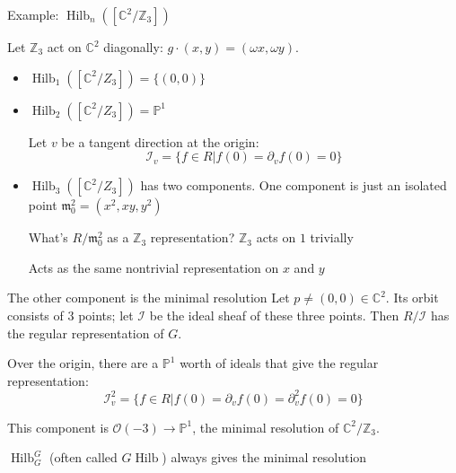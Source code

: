 \documentclass{beamer}
\DeclareMathOperator{\Hilb}{Hilb}
\newcommand{\C}{\mathbb{C}}
\newcommand{\Z}{\mathbb{Z}}
\newcommand{\proj}{\mathbb{P}}
\begin{document}
\begin{frame}{Example: $\Hilb_n([\C^2/\Z_3])$}

Let $\Z_3$ act on $\C^2$ diagonally: $g\cdot(x,y)=(\omega x, \omega y)$.
\begin{itemize}
\item $\Hilb_1([\C^2/Z_3])=\{(0,0)\}$ 
\item $\Hilb_2([\C^2/Z_3])=\proj^1$ 

Let $v$ be a tangent direction at the origin: 
$$\mathcal{I}_v=\{f\in R | f(0)=\partial_vf(0)=0\}$$
\item
$\Hilb_3([\C^2/Z_3])$ has two components.  One component is just an isolated point $\mathfrak{m}_0^2=(x^2, xy, y^2)$

\begin{block}{What's $R/\mathfrak{m}_0^2$ as a $\Z_3$ representation?} 
$\Z_3$ acts on $1$ trivially

Acts as the same nontrivial representation on $x$ and $y$
\end{block}


\end{itemize}



\end{frame}

\begin{frame}{The other  component is the minimal resolution}
Let $p\neq(0,0)\in\C^2$.  Its orbit consists of $3$ points; let $\mathcal{I}$ be the ideal sheaf of these three points.  Then $R/\mathcal{I}$ has the regular representation of $G$.  

Over the origin, there are a $\proj^1$ worth of ideals that give the regular representation: 
$$\mathcal{I}_v^2=\{f\in R| f(0)=\partial_vf(0)=\partial_v^2 f(0)=0\}$$

This component is $\mathcal{O}(-3)\to\proj^1$, the minimal resolution of $\C^2/\Z_3$.

\begin{block}{$\Hilb^G_G$ (often called $G\Hilb$) always gives the minimal resolution}
\end{block}

\end{frame}
\end{document}
